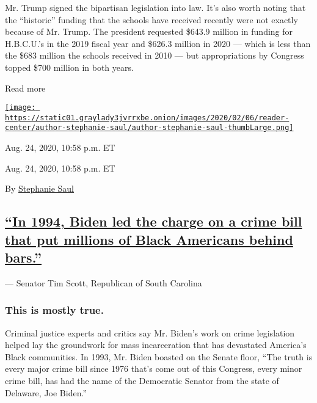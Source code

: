 Mr. Trump signed the bipartisan legislation into law. It's also worth
noting that the ``historic'' funding that the schools have received
recently were not exactly because of Mr. Trump. The president requested
\$643.9 million in funding for H.B.C.U.'s in the 2019 fiscal year and
\$626.3 million in 2020 --- which is less than the \$683 million the
schools received in 2010 --- but appropriations by Congress topped \$700
million in both years.

Read more

\href{https://www.nytimes3xbfgragh.onion/by/stephanie-saul}{\texttt{[image: https://static01.graylady3jvrrxbe.onion/images/2020/02/06/reader-center/author-stephanie-saul/author-stephanie-saul-thumbLarge.png]}}

Aug. 24, 2020, 10:58 p.m. ET

Aug. 24, 2020, 10:58 p.m. ET

By \href{https://www.nytimes3xbfgragh.onion/by/stephanie-saul}{Stephanie
Saul}

\hypertarget{in-1994-biden-led-the-charge-on-a-crime-bill-that-put-millions-of-black-americans-behind-bars}{%
\subsection{\texorpdfstring{\protect\hyperlink{in-1994-biden-led-the-charge-on-a-crime-bill-that-put-millions-of-black-americans-behind-bars}{``In
1994, Biden led the charge on a crime bill that put millions of Black
Americans behind
bars.''}}{``In 1994, Biden led the charge on a crime bill that put millions of Black Americans behind bars.''}}\label{in-1994-biden-led-the-charge-on-a-crime-bill-that-put-millions-of-black-americans-behind-bars}}

--- Senator Tim Scott, Republican of South Carolina

\hypertarget{this-is-mostly-true}{%
\subsubsection{\texorpdfstring{\textbf{This is mostly
true.}}{This is mostly true.}}\label{this-is-mostly-true}}

Criminal justice experts and critics say Mr. Biden's work on crime
legislation helped lay the groundwork for mass incarceration that has
devastated America's Black communities. In 1993, Mr. Biden boasted on
the Senate floor, ``The truth is every major crime bill since 1976
that's come out of this Congress, every minor crime bill, has had the
name of the Democratic Senator from the state of Delaware, Joe Biden.''

